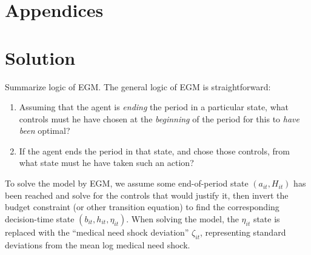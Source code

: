 \documentclass[12pt,pdftex,letterpaper]{article}
\newcommand{\Health}{h}
\newcommand{\PostHealth}{H}
\newcommand{\Bank}{b}
\newcommand{\Assets}{a}
\newcommand{\MedShk}{\eta}
\begin{document}
\appendix
\section*{Appendices}

\section{Solution}
\label{app:Solution}

Summarize logic of EGM. The general logic of EGM is straightforward:
\begin{enumerate}
\item Assuming that the agent is \textit{ending} the period in a particular state, what controls must he have chosen at the \textit{beginning} of the period for this to \textit{have been} optimal?

\item If the agent ends the period in that state, and chose those controls, from what state must he have taken such an action?
\end{enumerate}
To solve the model by EGM, we assume some end-of-period state $(\Assets_{it},\PostHealth_{it})$ has been reached and solve for the controls that would justify it, then invert the budget constraint (or other transition equation) to find the corresponding decision-time state $(\Bank_{it},\Health_{it},\MedShk_{it})$.  When solving the model, the $\MedShk_{it}$ state is replaced with the ``medical need shock deviation'' $\zeta_{it}$, representing standard deviations from the mean log medical need shock.
\end{document}
